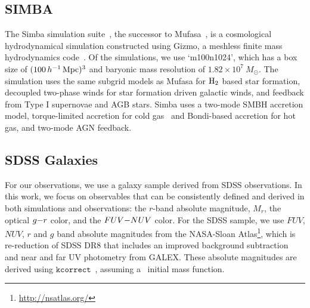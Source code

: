 \subsection{SIMBA} \label{sec:simba}
The {\sc Simba} simulation suite~\citep{dave2019}, the successor to {\sc
Mufasa}~\citep{dave2016, dave2017, dave2017a}, is a cosmological hydrodynamical
simulation constructed using {\sc Gizmo}, a meshless finite mass hydrodynamics 
code~\citep{hopkins2015, hopkins2017}. Of the simulations, we use
`m100n1024', which has a box size of $(100\,h^{-1}\,{\rm Mpc})^3$ and baryonic 
mass resolution of $1.82 \times 10^7\ M_\odot$. The simulation uses the same
subgrid models as {\sc Mufasa} for $\rm H_2$ based star formation, decoupled
two-phase winds for star formation driven galactic winds, and feedback from 
Type I supernovae and AGB stars. {\sc Simba} uses a two-mode SMBH accretion 
model, torque-limited accretion for cold gas~\citep{angles-alcazar2017} and 
Bondi-based accretion for hot gas, and two-mode AGN feedback. %

\subsection{SDSS Galaxies} \label{sec:obs} 
For our observations, we use a galaxy sample derived from SDSS observations. 
In this work, we focus 
on observables that can be consistently defined and derived in both simulations 
and observations: the $r$-band absolute magnitude, $M_r$, the optical $g{-}r$
color, and the $FUV{-}NUV$ color. For the SDSS sample, we use $FUV$,
$NUV$, $r$ and $g$ band absolute magnitudes from the NASA-Sloan
Atlas\footnote{\url{http://nsatlas.org/}}, which is re-reduction of SDSS DR8
\citep{aihara2011} that includes an improved background subtraction~\citep{blanton2011} 
and near and far UV photometry from GALEX. These absolute magnitudes are
derived using $\mathtt{kcorrect}$~\citep{blanton2007a}, assuming
a~\cite{chabrier2003} initial mass function. 


